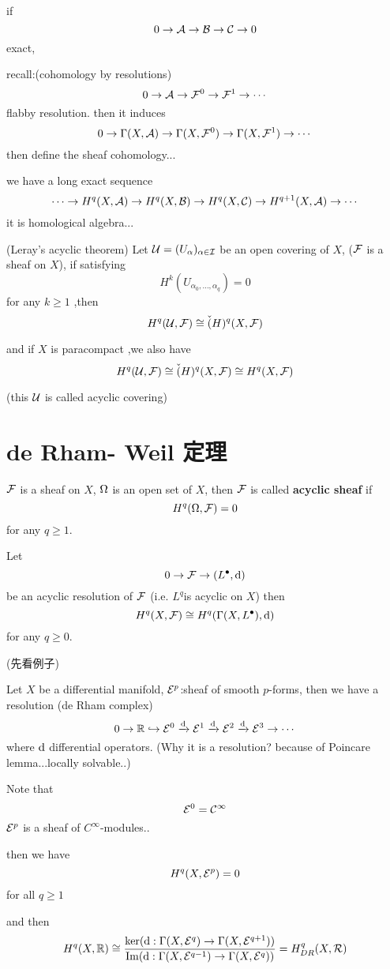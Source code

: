 if
$$0\to \mathcal{A}\to\mathcal{B}\to\mathcal{C}\to 0$$
exact,

recall:(cohomology by resolutions)
$$
0\to\mathcal{A}\to\mathcal{F}^0\to\mathcal{F}^1\to\cdots
$$
flabby resolution. then it induces
$$0\to\Gamma(X,\mathcal{A})\to\Gamma(X,\mathcal{F}^0)\to\Gamma(X,\mathcal{F}^1)\to\cdots$$
then define the sheaf cohomology...

we have a long exact sequence
$$
\cdots\to H^q(X,\mathcal{A})\to H^q(X,\mathcal{B})\to H^q(X,\mathcal{C})\to H^{q+1}(X,\mathcal{A})\to\cdots
$$
it is homological algebra...

\begin{thm}(Leray's acyclic theorem)
Let $\mathcal{U}=(U_{\alpha})_{\alpha\in\mathcal{I}}$ be an open covering of $X$,
($\mathcal{F}$ is a sheaf on $X$), if satisfying
$$H^k(U_{\alpha_0,...,\alpha_q})=0$$
for any $k \geq 1$ ,then
$$H^q(\mathcal{U},\mathcal{F})\cong \check(H)^q(X,\mathcal{F})$$

and if $X$ is paracompact ,we also have
$$H^q(\mathcal{U},\mathcal{F})\cong \check(H)^q(X,\mathcal{F})\cong H^q(X,\mathcal{F})$$

\end{thm}
(this $\mathcal{U}$ is called acyclic covering)

\section{de Rham- Weil 定理}
\begin{definition}
$\mathcal{F}$ is a sheaf on $X$, $\Omega$ is an open set of $X$,
then $\mathcal{F}$ is called \textbf{acyclic sheaf} if
$$H^q(\Omega,\mathcal{F})=0$$
for any $q\geq 1$.
\end{definition}

\begin{thm}
Let
$$0\to\mathcal{F}\to(L^{\bullet},\mathrm{d})$$
be an acyclic resolution of $\mathcal{F}$
(i.e. $L^q$is acyclic on $X$)
then
$$H^q(X,\mathcal{F})\cong H^q(\Gamma(X,L^{\bullet}),\mathrm{d})$$
for any $q\geq 0$.
\end{thm}

(先看例子)

\begin{example}
Let $X$ be a differential manifold,
$\mathcal{E}^p$:sheaf of smooth $p$-forms, then we have a resolution
(de Rham complex)
$$0\to\mathbb{R}\hookrightarrow\mathcal{E}^0\xrightarrow{\mathrm{d}}\mathcal{E}^1
\xrightarrow{\mathrm{d}}\mathcal{E}^2\xrightarrow{\mathrm{d}}\mathcal{E}^3\to\cdots$$
where $\mathrm{d}$ differential operators.
(Why it is a resolution? because of Poincare lemma...locally solvable..)

Note that
$$\mathcal{E}^0=\mathcal{C}^{\infty}$$
$\mathcal{E}^p$ is a sheaf of $C^{\infty}$-modules..

then we have
$$H^q(X,\mathcal{E}^p)=0$$
for all $q\geq1$

and then
$$H^q(X,\mathbb{R})\cong
\frac{\ker(\mathrm{d}:\Gamma(X,\mathcal{E}^q)\to\Gamma(X,\mathcal{E}^{q+1}))}
     {\operatorname{Im}(\mathrm{d}:\Gamma(X,\mathcal{E}^{q-1})\to\Gamma(X,\mathcal{E}^q))}
=H_{DR}^q(X,\mathcal{R})
$$
\end{example}

